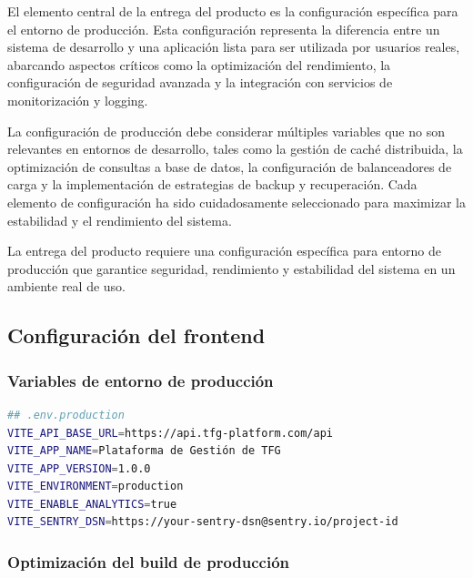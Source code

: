 \documentclass[12pt,a4paper,oneside]{report}
\begin{document}
El elemento central de la entrega del producto es la configuración
específica para el entorno de producción. Esta configuración representa
la diferencia entre un sistema de desarrollo y una aplicación lista para
ser utilizada por usuarios reales, abarcando aspectos críticos como la
optimización del rendimiento, la configuración de seguridad avanzada y
la integración con servicios de monitorización y logging.

La configuración de producción debe considerar múltiples variables que
no son relevantes en entornos de desarrollo, tales como la gestión de
caché distribuida, la optimización de consultas a base de datos, la
configuración de balanceadores de carga y la implementación de
estrategias de backup y recuperación. Cada elemento de configuración ha
sido cuidadosamente seleccionado para maximizar la estabilidad y el
rendimiento del sistema.

La entrega del producto requiere una configuración específica para
entorno de producción que garantice seguridad, rendimiento y estabilidad
del sistema en un ambiente real de uso.

\subsection{Configuración del
frontend}\label{configuraciuxf3n-del-frontend}

\subsubsection{Variables de entorno de
producción}\label{variables-de-entorno-de-producciuxf3n}

\begin{lstlisting}[language=bash]
## .env.production
VITE_API_BASE_URL=https://api.tfg-platform.com/api
VITE_APP_NAME=Plataforma de Gestión de TFG
VITE_APP_VERSION=1.0.0
VITE_ENVIRONMENT=production
VITE_ENABLE_ANALYTICS=true
VITE_SENTRY_DSN=https://your-sentry-dsn@sentry.io/project-id
\end{lstlisting}

\subsubsection{Optimización del build de
producción}\label{optimizaciuxf3n-del-build-de-producciuxf3n}
\end{document}
